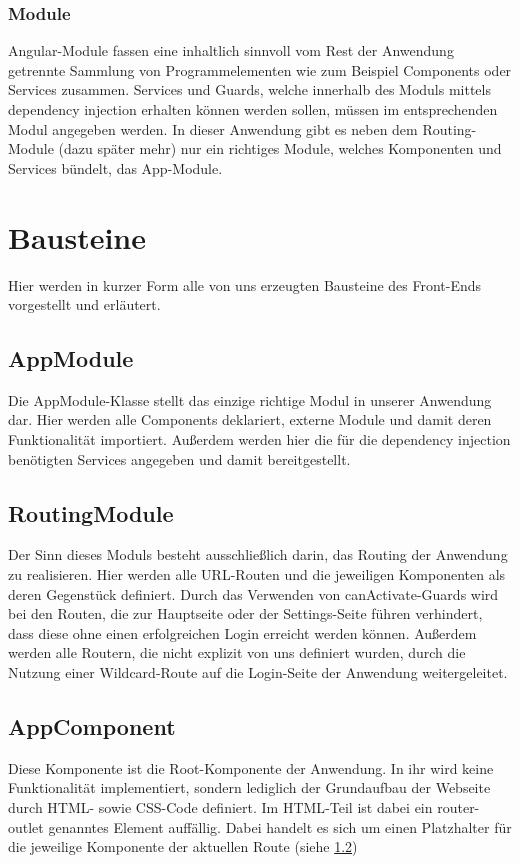 \subsubsection{Module}
Angular-Module fassen eine inhaltlich sinnvoll vom Rest der Anwendung getrennte Sammlung von Programmelementen wie zum Beispiel Components oder Services zusammen. Services und Guards, welche innerhalb des Moduls mittels dependency injection erhalten können werden sollen, müssen im entsprechenden Modul angegeben werden. In dieser Anwendung gibt es neben dem Routing-Module (dazu später mehr) nur ein richtiges Module, welches Komponenten und Services bündelt, das App-Module. \cite{OWA18}

\section{Bausteine}
Hier werden in kurzer Form alle von uns erzeugten Bausteine des Front-Ends vorgestellt und erläutert.

\subsection{AppModule}
Die AppModule-Klasse stellt das einzige richtige Modul in unserer Anwendung dar. Hier werden alle Components deklariert, externe Module und damit deren Funktionalität importiert. Außerdem werden hier die für die dependency injection benötigten Services angegeben und damit bereitgestellt.

\subsection{RoutingModule}
\label{subsection_routingModule}
Der Sinn dieses Moduls besteht ausschließlich darin, das Routing der Anwendung zu realisieren. Hier werden alle \acs{URL}-Routen und die jeweiligen Komponenten als deren Gegenstück definiert. Durch das Verwenden von canActivate-Guards wird bei den Routen, die zur Hauptseite oder der Settings-Seite führen verhindert, dass diese ohne einen erfolgreichen Login erreicht werden können. Außerdem werden alle Routern, die nicht explizit von uns definiert wurden, durch die Nutzung einer Wildcard-Route auf die Login-Seite der Anwendung weitergeleitet.

\subsection{AppComponent}
Diese Komponente ist die Root-Komponente der Anwendung. In ihr wird keine Funktionalität implementiert, sondern lediglich der Grundaufbau der Webseite durch \acs{HTML}- sowie \acs{CSS}-Code definiert. Im \acs{HTML}-Teil ist dabei ein \glqq{}router-outlet\grqq{} genanntes Element auffällig. Dabei handelt es sich um einen Platzhalter für die jeweilige Komponente der aktuellen Route (siehe \ref{subsection_routingModule})

